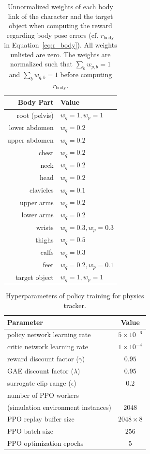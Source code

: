 \begin{table}[t]
    \centering
    \begin{tabular}{rl}
    \toprule
       \textbf{Body Part}  &  \quad\textbf{Value} \\
       \midrule
       root (pelvis) & $w_q = 1, w_p = 1$\\
       lower abdomen & $w_q = 0.2$\\
       upper abdomen & $w_q = 0.2$\\
       chest & $w_q = 0.2$\\
       neck & $w_q = 0.2$\\
       head & $w_q = 0.2$\\
       clavicles & $w_q = 0.1$\\
       upper arms & $w_q = 0.2$ \\
       lower arms & $w_q = 0.2$\\
       wrists & $w_q = 0.3, w_p = 0.3$\\
       thighs & $w_q = 0.5$\\
       calfs & $w_q = 0.3$\\
       feet & $w_q = 0.2, w_p = 0.1$\\
       target object & $w_q = 1, w_p = 1$ \\
        \bottomrule
    \end{tabular}
    \caption{Unnormalized weights of each body link of the character and the target object when computing the reward regarding body pose errors (cf. $r_\text{body}$ in Equation~\ref{eq:r_body}). All weights unlisted are zero.
    The weights are normalized such that $\sum_b w_{p,b}=1$ and $\sum_b w_{q,b}=1$ before computing $r_\text{body}$.}
    \label{tab:rl_weights}
\end{table}

\begin{table}[t]
    \centering
\begin{tabular}{lc}
    \toprule
    \textbf{Parameter} & \textbf{Value}\\
    \midrule
    policy network learning rate & $5 \times 10^{-6}$\\
    critic network learning rate & $1 \times 10^{-4}$\\
    reward discount factor ($\gamma$) & $0.95$ \\
    GAE discount factor ($\lambda$) & $0.95$ \\
    surrogate clip range ($\epsilon$) & $0.2$ \\
    number of PPO workers & \\
    \quad (simulation environment instances) & $2048$ \\
    PPO replay buffer size & $2048\times8$ \\
    PPO batch size & $256$ \\
    PPO optimization epochs & $5$ \\
  \bottomrule
  \end{tabular}
    \caption{Hyperparameters of policy training for physics tracker.}
    \label{tab:rl_hyper}
    
\end{table}


